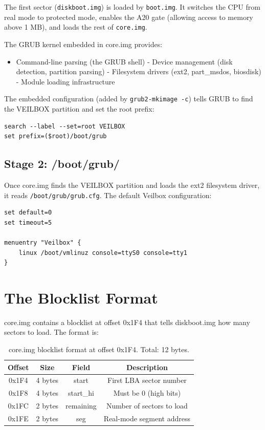 The first sector (\texttt{diskboot.img}) is loaded by \texttt{boot.img}.
It switches the CPU from real mode to protected mode, enables the A20
gate (allowing access to memory above 1 MB), and loads the rest of
\texttt{core.img}.

The GRUB kernel embedded in core.img provides:
\begin{itemize}[nosep]
  \item Command-line parsing (the GRUB shell)
  - Device management (disk detection, partition parsing)
  - Filesystem drivers (ext2, part\_msdos, biosdisk)
  - Module loading infrastructure
\end{itemize}

The embedded configuration (added by \texttt{grub2-mkimage -c}) tells
GRUB to find the VEILBOX partition and set the root prefix:

\begin{lstlisting}
search --label --set=root VEILBOX
set prefix=($root)/boot/grub
\end{lstlisting}

\subsection{Stage 2: /boot/grub/}

Once core.img finds the VEILBOX partition and loads the ext2 filesystem
driver, it reads \texttt{/boot/grub/grub.cfg}. The default Veilbox
configuration:

\begin{lstlisting}
set default=0
set timeout=5

menuentry "Veilbox" {
    linux /boot/vmlinuz console=ttyS0 console=tty1
}
\end{lstlisting}

\section{The Blocklist Format}

core.img contains a blocklist at offset 0x1F4 that tells diskboot.img
how many sectors to load. The format is:

\begin{table}[H]
\centering
\begin{tabular}{|c|c|c|c|}
\hline
\textbf{Offset} & \textbf{Size} & \textbf{Field} & \textbf{Description} \\
\hline
0x1F4 & 4 bytes & start & First LBA sector number \\
0x1F8 & 4 bytes & start\_hi & Must be 0 (high bits) \\
0x1FC & 2 bytes & remaining & Number of sectors to load \\
0x1FE & 2 bytes & seg & Real-mode segment address \\
\hline
\end{tabular}
\caption{core.img blocklist format at offset 0x1F4. Total: 12 bytes.}
\label{tab:blocklist}
\end{table}

